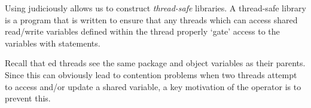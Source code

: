 Using  judiciously allows us to construct \emph{thread-safe} libraries. A thread-safe library is a program that is written to ensure that any threads which can access shared read/write variables defined within the thread properly `gate' access to the variables with  statements.

Recall that ed threads see the same package and object variables as their parents. Since this can obviously lead to contention problems when two threads attempt to access and/or update a shared variable, a key motivation of the  operator is to prevent this.

